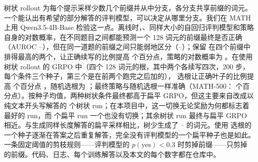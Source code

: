 树状 rollout 为每个提示采样少数几个前缀并从中分支，各分支共享前缀的词元。一个能认出有希望的部分解答的评判模型，可以决定从哪里分支。我们在 MATH 上用 Qwen3.5-4B-Base 检验这一点。离线时，\kev{}、同样大小的自回归评判模型和策略自身的对数概率，在不同题目之间都能预测一个 128 词元的前缀最终是否正确（AUROC --），但在同一道题的前缀之间只能弱地区分（--）；保留 \kev{} 在四个前缀中排得最高的两个，让正确续写的比例提高  个百分点，策略的对数概率为 。在使用树状 rollout 的 GRPO 中（四个 128 词元的根，其中两个各续写四次，200 步，每个条件三个种子，第三个是在前两个跑完之后加的），\kev{} 选根让正确叶子的比例提高  个百分点 ，随机选根为 ；最终策略与随机选根一样准确（MATH-500：  个百分点）。按种子均值，两种树状条件最终都高于扁平 GRPO，但这主要来自改成以纯文本开头写解答的  个树状 run；在本项目中，这一切换无论奖励为何都标志着最好的 run，而  个扁平 run 一个也没有切换；其余树状 run 最终与扁平 GRPO 相近。与生成同样长度解答的扁平采样相比，树少生成了 -- 的词元。使用 \kev{} 选根的一个种子逐渐在答案之后重复解答，完全没有评判模型的一个扁平种子也是如此。一条固定阈值的剪枝规则——评判模型的 $p(\text{yes})<0.3$ 时剪掉前缀——只剪掉  的前缀。代码、日志、每个训练解答以及本文的每个数字都在仓库中。
